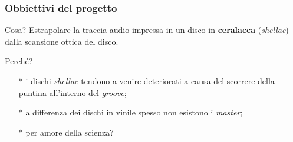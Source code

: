 \begin{frame}

\frametitle{Obbiettivi del progetto}

\begin{block}{Cosa?}
Estrapolare la traccia audio impressa in un disco in \textbf{ceralacca}
(\emph{shellac}) dalla scansione ottica del disco.
\end{block}

\begin{block}{Perché?}
\begin{itemize}
\item[*]i dischi \emph{shellac} tendono a venire deteriorati a causa del
scorrere della puntina all'interno del \emph{groove};
\item[*]a differenza dei dischi in vinile spesso non  esistono i \emph{master};
\item[*]per amore della scienza?
\end{itemize}
\end{block}

\end{frame}
